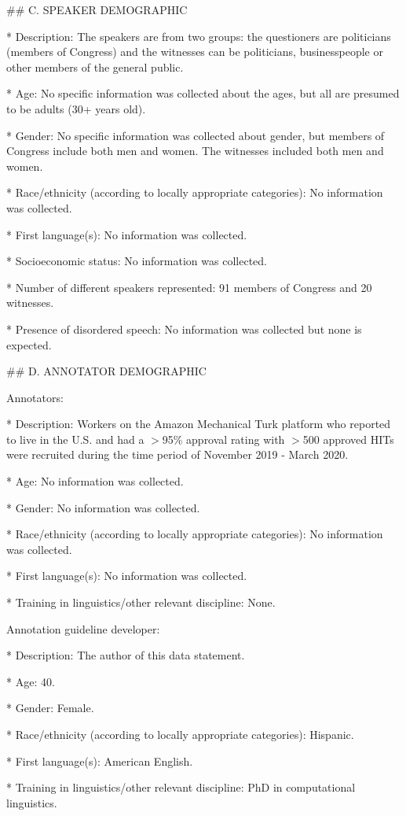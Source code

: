 \#\# C. SPEAKER DEMOGRAPHIC

* Description: The speakers are from two groups: the questioners are politicians (members of Congress) and the witnesses can be politicians, businesspeople or other members of the general public. 

* Age: No specific information was collected about the ages, but all are presumed to be adults (30+ years old).

* Gender: No specific information was collected about gender, but members of Congress include both men and women. The witnesses included both men and women.

* Race/ethnicity (according to locally appropriate categories): No information was collected.

* First language(s): No information was collected.

* Socioeconomic status: No information was collected.

* Number of different speakers represented: 91 members of Congress and 20 witnesses.

* Presence of disordered speech: No information was collected but none is expected.
 
\#\# D. ANNOTATOR DEMOGRAPHIC

Annotators:

* Description: Workers on the Amazon Mechanical Turk platform who reported to live in the U.S. and had a $>$95\% approval rating with $>$500 approved HITs were recruited during the time period of November 2019 - March 2020.

* Age: No information was collected.

* Gender: No information was collected.

* Race/ethnicity (according to locally appropriate categories): No information was collected.

* First language(s): No information was collected.

* Training in linguistics/other relevant discipline: None.

Annotation guideline developer:

* Description: The author of this data statement.

* Age: 40.

* Gender: Female.

* Race/ethnicity (according to locally appropriate categories): Hispanic.

* First language(s): American English.

* Training in linguistics/other relevant discipline: PhD in computational linguistics.



